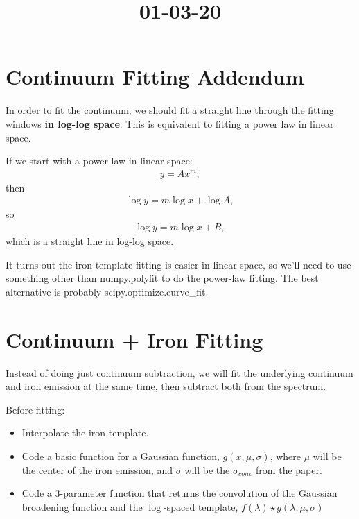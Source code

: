 \documentclass[12pt]{article}
\begin{document}
\title{01-03-20}
\author{}
\maketitle

\section{Continuum Fitting Addendum}
In order to fit the continuum, we should fit a straight line through the fitting windows \textbf{in log-log space}. This is equivalent to fitting a power law in linear space. 

If we start with a power law in linear space:
\begin{align*}
    y = A x^m,
\end{align*}
then
\begin{align*}
    \log y = m \log x + \log A,
\end{align*}
so 
\begin{align*}
    \log y = m \log x + B,
\end{align*}
which is a straight line in log-log space.

It turns out the iron template fitting is easier in linear space, so we'll need to use something other than numpy.polyfit to do the power-law fitting. The best alternative is probably scipy.optimize.curve\_fit.
\section{Continuum + Iron Fitting}
    Instead of doing just continuum subtraction, we will fit the underlying continuum and iron emission at the same time, then subtract both from the spectrum.

    Before fitting:
    \begin{itemize}
        \item Interpolate the iron template.
        \item Code a basic function for a Gaussian function, $g(x, \mu, \sigma)$, where $\mu$ will be the center of the iron emission, and $\sigma$ will be the $\sigma_{conv}$ from the paper.
        \item Code a 3-parameter function that returns the convolution of the Gaussian broadening function and the $\log$-spaced template, $f(\lambda) \star g(\lambda, \mu, \sigma)$
    \end{itemize}
\end{document}
